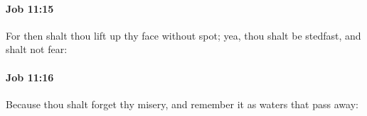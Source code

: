 		\paragraph{Job 11:15} %
			\label{JOB-11-15}

			For then shalt thou lift up thy face without spot; yea, thou shalt be stedfast, and shalt not fear:


		\paragraph{Job 11:16} %
			\label{JOB-11-16}

			Because thou shalt forget thy misery, and remember it as waters that pass away:


